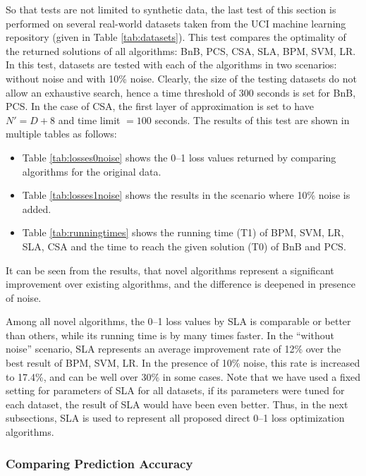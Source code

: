 So that tests are not limited to synthetic data, the last test of this
section is performed on several real-world datasets taken from the UCI
machine learning repository (given in Table \ref{tab:datasets}). This
test compares the optimality of the returned solutions of all
algorithms: BnB, PCS, CSA, SLA, BPM, SVM, LR. In this test, datasets
are tested with each of the algorithms in two scenarios: without noise
and with 10\% noise. Clearly, the size of the testing datasets do not
allow an exhaustive search, hence a time threshold of 300 seconds is
set for BnB, PCS. In the case of CSA, the first layer of approximation
is set to have $N'=D+8$ and time limit $=100$ seconds. The results of
this test are shown in multiple tables as follows:
\begin{itemize}
\setlength{\itemsep}{4pt} 
\setlength{\parskip}{1pt}
\setlength{\parsep}{1pt}
\item Table \ref{tab:losses0noise} shows the 0--1 loss values returned by comparing algorithms for the original data.
\item Table \ref{tab:losses1noise} shows the results in the scenario where 10\% noise is added.
\item Table \ref{tab:runningtimes} shows the running time (T1) of BPM, SVM, LR, SLA, CSA and the time to reach the given solution (T0) of BnB and PCS.
\end{itemize}

It can be seen from the results, that novel algorithms represent a
significant improvement over existing algorithms, and the difference
is deepened in presence of noise.

Among all novel algorithms, the 0--1 loss values by SLA is comparable
or better than others, while its running time is by many times
faster. In the ``without noise'' scenario, SLA represents an average
improvement rate of 12\% over the best result of BPM, SVM, LR. In the
presence of 10\% noise, this rate is increased to 17.4\%, and can be
well over 30\% in some cases. Note that we have used a fixed setting
for parameters of SLA for all datasets, if its parameters were tuned
for each dataset, the result of SLA would have been even better. Thus,
in the next subsections, SLA is used to represent all proposed direct
0--1 loss optimization algorithms.


\subsubsection{Comparing Prediction Accuracy}
\label{ssec:rc.prediction}

